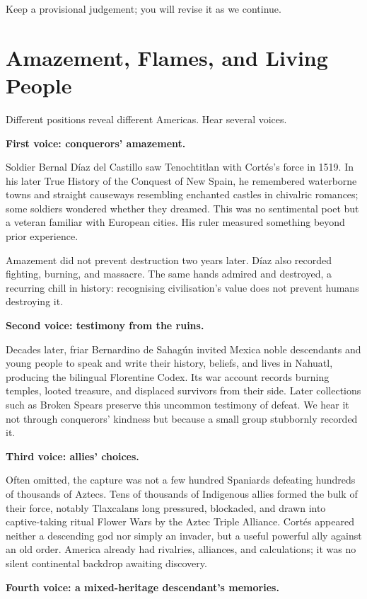 Keep a provisional judgement; you will revise it as we continue.

\section{Amazement, Flames, and Living People}
Different positions reveal different Americas. Hear several voices.

\textbf{First voice: conquerors' amazement.}

Soldier Bernal Díaz del Castillo saw Tenochtitlan with Cortés's force in 1519. In his later True History of the Conquest of New Spain, he remembered waterborne towns and straight causeways resembling enchanted castles in chivalric romances; some soldiers wondered whether they dreamed. This was no sentimental poet but a veteran familiar with European cities. His ruler measured something beyond prior experience.

Amazement did not prevent destruction two years later. Díaz also recorded fighting, burning, and massacre. The same hands admired and destroyed, a recurring chill in history: recognising civilisation's value does not prevent humans destroying it.

\textbf{Second voice: testimony from the ruins.}

Decades later, friar Bernardino de Sahagún invited Mexica noble descendants and young people to speak and write their history, beliefs, and lives in Nahuatl, producing the bilingual Florentine Codex. Its war account records burning temples, looted treasure, and displaced survivors from their side. Later collections such as Broken Spears preserve this uncommon testimony of defeat. We hear it not through conquerors' kindness but because a small group stubbornly recorded it.

\textbf{Third voice: allies' choices.}

Often omitted, the capture was not a few hundred Spaniards defeating hundreds of thousands of Aztecs. Tens of thousands of Indigenous allies formed the bulk of their force, notably Tlaxcalans long pressured, blockaded, and drawn into captive-taking ritual Flower Wars by the Aztec Triple Alliance. Cortés appeared neither a descending god nor simply an invader, but a useful powerful ally against an old order. America already had rivalries, alliances, and calculations; it was no silent continental backdrop awaiting discovery.

\textbf{Fourth voice: a mixed-heritage descendant's memories.}


